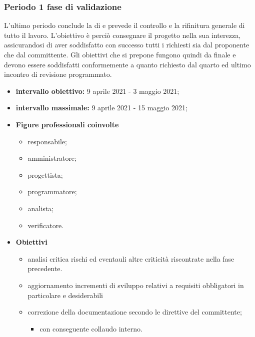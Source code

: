 \subsubsection{Periodo 1 fase di validazione}
 L'ultimo periodo conclude la  di  e prevede il controllo e la rifinitura generale di tutto il lavoro. L'obiettivo è perciò consegnare il progetto nella sua interezza, assicurandosi di aver soddisfatto con successo tutti i  richiesti sia dal proponente che dal committente. Gli obiettivi che si prepone fungono quindi da  finale e devono essere soddisfatti conformemente a quanto richiesto dal quarto ed ultimo incontro di revisione programmato.
 \begin{itemize}
         \item \textbf{intervallo obiettivo: } 9 aprile 2021 - 3 maggio 2021;
         \item \textbf{intervallo massimale: } 9 aprile 2021 - 15 maggio 2021;
         \item  \textbf{Figure professionali coinvolte}
         \begin{itemize}
            \item responsabile;
            \item amministratore;
            \item progettista;
            \item programmatore;
            \item analista;
            \item verificatore.
        \end{itemize}
         \item \textbf{Obiettivi}
         \begin{itemize}
            \item analisi critica rischi ed eventauli altre criticità riscontrate nella fase precedente.
            \item aggiornamento incrementi di sviluppo relativi a requisiti obbligatori in particolare e desiderabili 
            \item correzione della documentazione secondo le direttive del committente;
            \begin{itemize}
                \item con conseguente collaudo interno.
            \end{itemize}
 \end{itemize}
 \end{itemize}
